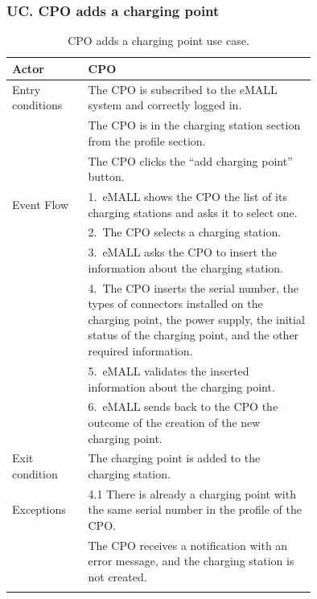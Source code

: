 \subsubsection*{UC\cuc . CPO adds a charging point}
\begin{center}
    \begin{longtable}{lp{0.75\linewidth}}
        \hline
        Actor            & CPO                                                                                             \\
        \hline
        Entry conditions & The CPO is subscribed to the eMALL system and correctly logged in.                              \\
        & The CPO is in the charging station section from the profile section.                            \\
        & The CPO clicks the “add charging point” button.                                                 \\
        \hline
        Event Flow       & 1.\ eMALL shows the CPO the list of its charging stations and asks it to select one.            \\
        & 2.\ The CPO selects a charging station.                                                         \\
        & 3.\ eMALL asks the CPO to insert the information about the charging station.                    \\
        & 4.\ The CPO inserts the serial number, the types of connectors installed on the charging point, the power supply,
        the initial status of the charging point, and the other required information. \\
        & 5.\ eMALL validates the inserted information about the charging point.                          \\
        & 6.\ eMALL sends back to the CPO the outcome of the creation of the new charging point.          \\
        \hline
        Exit condition   & The charging point is added to the charging station.                                            \\
        \hline
        Exceptions       & 4.1 There is already a charging point with the same serial number in the profile of the CPO.    \\
        & The CPO receives a notification with an error message, and the charging station is not created. \\
        \hline
        \caption{CPO adds a charging point use case.}
        \label{tab: CPO_adds_charging_point_use_case}
    \end{longtable}


\end{center}

